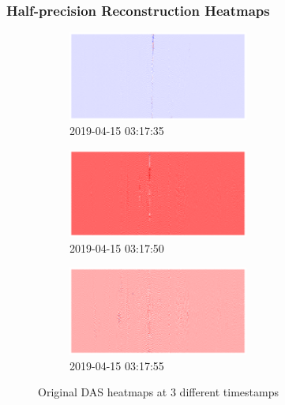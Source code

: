 \subsubsection{Half-precision Reconstruction Heatmaps}
\begin{figure}[!p]
\centering
\begin{subfigure}{\textwidth}
    \centering
    \includegraphics[width=0.65\textwidth]{figures/anomalies/before/20190415_031735.png}
    \caption{2019-04-15 03:17:35}
\end{subfigure}
\vspace{1em}
\begin{subfigure}{\textwidth}
    \centering
    \includegraphics[width=0.65\textwidth]{figures/anomalies/before/20190415_031750.png}
    \caption{2019-04-15 03:17:50}
\end{subfigure}
\vspace{1em}
\begin{subfigure}{\textwidth}
    \centering
    \includegraphics[width=0.65\textwidth]{figures/anomalies/before/20190415_031755.png}
    \caption{2019-04-15 03:17:55}
\end{subfigure}
\caption{Original DAS heatmaps at 3 different timestamps}
\label{fig:original_heatmaps}
\end{figure}
